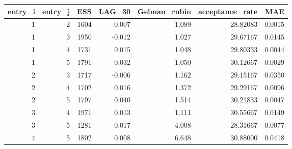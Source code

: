 \begin{longtable}{rrrrrrr}
\toprule
entry\_i & entry\_j & ESS & LAG\_30 & Gelman\_rubin & acceptance\_rate & MAE \\ 
\midrule
1 & 2 & 1604 & -0.007 & 1.089 & 28.82083 & 0.0015 \\ 
1 & 3 & 1950 & -0.012 & 1.027 & 29.67167 & 0.0145 \\ 
1 & 4 & 1731 & 0.015 & 1.048 & 29.80333 & 0.0044 \\ 
1 & 5 & 1791 & 0.032 & 1.050 & 30.12667 & 0.0029 \\ 
2 & 3 & 1717 & -0.006 & 1.162 & 29.15167 & 0.0350 \\ 
2 & 4 & 1702 & 0.016 & 1.372 & 29.29167 & 0.0096 \\ 
2 & 5 & 1797 & 0.040 & 1.514 & 30.21833 & 0.0047 \\ 
3 & 4 & 1971 & 0.013 & 1.111 & 30.55667 & 0.0149 \\ 
3 & 5 & 1281 & 0.017 & 4.008 & 28.31667 & 0.0077 \\ 
4 & 5 & 1802 & 0.008 & 6.648 & 30.88000 & 0.0418 \\ 
\bottomrule
\end{longtable}

